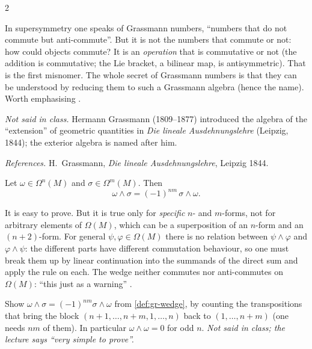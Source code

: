 \begin{paracol}{2}
\begin{example}
\end{example}
\begin{aside}
In supersymmetry one speaks of Grassmann numbers, ``numbers that do not commute but anti-commute''. But it is not the numbers that commute or not: how could objects commute? It is an \emph{operation} that is commutative or not (the addition is commutative; the Lie bracket, a bilinear map, is antisymmetric). That is the first misnomer. The whole secret of Grassmann numbers is that they can be understood by reducing them to such a Grassmann algebra (hence the name). Worth emphasising
    .
\end{aside}
\begin{history}[Grassmann]
\emph{Not said in class.} Hermann Grassmann (1809--1877) introduced the algebra of the ``extension'' of geometric quantities in \emph{Die lineale Ausdehnungslehre} (Leipzig, 1844); the exterior algebra is named after him.\par
\smallskip
\emph{References.} H.~Grassmann, \emph{Die lineale Ausdehnungslehre}, Leipzig 1844.
\end{history}

\begin{theorem}\label{thm:gr-commute}
Let $\omega\in\Omega^n(M)$ and $\sigma\in\Omega^m(M)$. Then
\[
  \omega\wedge\sigma=(-1)^{nm}\,\sigma\wedge\omega.
\]
  
\end{theorem}
It is easy to prove. But it is true only for \emph{specific} $n$- and $m$-forms, not for arbitrary elements of $\Omega(M)$, which can be a superposition of an $n$-form and an $(n+2)$-form. For general $\psi,\varphi\in\Omega(M)$ there is no relation between $\psi\wedge\varphi$ and $\varphi\wedge\psi$: the different parts have different commutation behaviour, so one must break them up
by linear continuation into the summands of the direct sum and apply the rule on each. The wedge neither commutes nor anti-commutes on $\Omega(M)$: ``this just as a warning''      .
\begin{exercise}\label{ex:gr-sign}
Show $\omega\wedge\sigma=(-1)^{nm}\sigma\wedge\omega$ from \cref{def:gr-wedge}, by counting the transpositions that bring the block $(n+1,\dots,n+m,1,\dots,n)$ back to $(1,\dots,n+m)$ (one needs $nm$ of them). In particular $\omega\wedge\omega=0$ for odd $n$. \emph{Not said in class; the lecture says ``very simple to prove''.}
\end{exercise}


\end{paracol}
